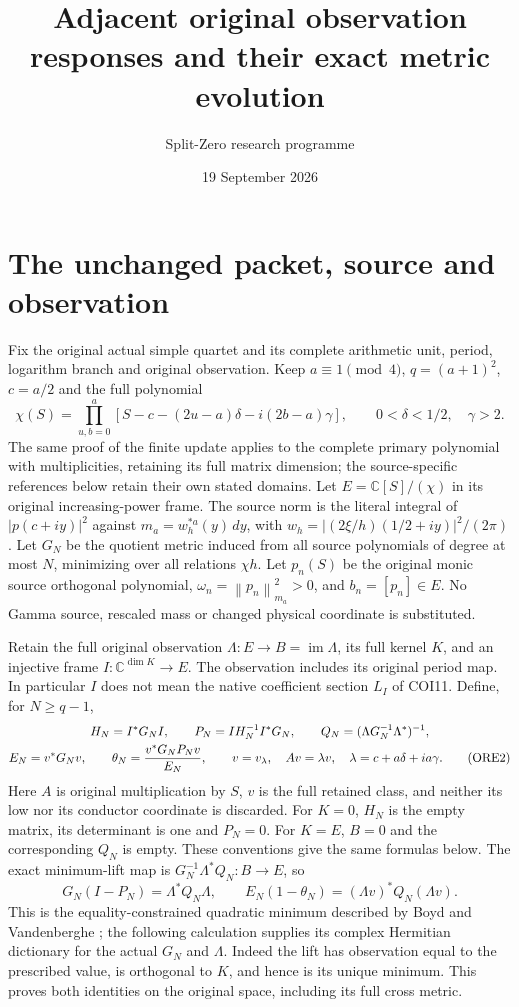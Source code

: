 \documentclass[11pt]{article}
\title{Adjacent original observation responses and their exact metric evolution}
\author{Split-Zero research programme}\date{19 September 2026}
\newcommand{\C}{\mathbb C}
\newcommand{\im}{\operatorname{im}}
\newcommand{\norm}[1]{\left\lVert#1\right\rVert}
\begin{document}
\maketitle

\section{The unchanged packet, source and observation}
Fix the original actual simple quartet and its complete arithmetic unit,
period, logarithm branch and original observation. Keep
$a\equiv1\pmod4$, $q=(a+1)^2$, $c=a/2$ and the full polynomial
\[
 \chi(S)=\prod_{u,b=0}^a
 [S-c-(2u-a)\delta-i(2b-a)\gamma],\qquad
 0<\delta<1/2,\quad\gamma>2.                         \tag{ORE1}
\]
The same proof of the finite update applies to the complete primary
polynomial with multiplicities, retaining its full matrix dimension;
the source-specific references below retain their own stated domains.
Let $E=\C[S]/(\chi)$ in its original increasing-power frame.
The source norm is the literal integral of $|p(c+iy)|^2$ against
$m_a=w_h^{*a}(y)\,dy$, with $w_h=|(2\xi/h)(1/2+iy)|^2/(2\pi)$.
Let $G_N$ be the quotient metric induced from all source polynomials
of degree at most $N$, minimizing over all relations $\chi h$.
Let $p_n(S)$ be the original monic source orthogonal polynomial,
$\omega_n=\norm{p_n}_{m_a}^2>0$, and $b_n=[p_n]\in E$.
No Gamma source, rescaled mass or changed physical coordinate is substituted.

Retain the full original observation $\Lambda:E\to B=\im\Lambda$,
its full kernel $K$, and an injective frame $I:\C^{\dim K}\to E$.
The observation includes its original period map. In particular $I$
does not mean the native coefficient section $L_I$ of COI11.
Define, for $N\ge q-1$,
\begin{gather}
 H_N=I^*G_NI,\qquad
 P_N=I H_N^{-1}I^*G_N,\qquad
 Q_N=(\Lambda G_N^{-1}\Lambda^*)^{-1},\notag\\
 E_N=v^*G_Nv,\qquad
 \theta_N=\frac{v^*G_NP_Nv}{E_N},\qquad
 v=v_\lambda,\quad Av=\lambda v,\quad
 \lambda=c+a\delta+ia\gamma.                         \tag{ORE2}
\end{gather}
Here $A$ is original multiplication by $S$, $v$ is the full retained
class, and neither its low nor its conductor coordinate is discarded.
For $K=0$, $H_N$ is the empty matrix, its determinant is one and
$P_N=0$. For $K=E$, $B=0$ and the corresponding $Q_N$ is empty.
These conventions give the same formulas below.
The exact minimum-lift map is
$G_N^{-1}\Lambda^*Q_N:B\to E$, so
\[
 G_N(I-P_N)=\Lambda^*Q_N\Lambda,
 \qquad E_N(1-\theta_N)=(\Lambda v)^*Q_N(\Lambda v).    \tag{ORE3}
\]
This is the equality-constrained quadratic minimum described by
Boyd and Vandenberghe \cite[Appendix C.4.1, p.~673]{Boyd};
the following calculation supplies its complex Hermitian dictionary
for the actual $G_N$ and $\Lambda$.
Indeed the lift has observation equal to the prescribed value, is
orthogonal to $K$, and hence is its unique minimum. This proves both
identities on the original space, including its full cross metric.
\end{document}
